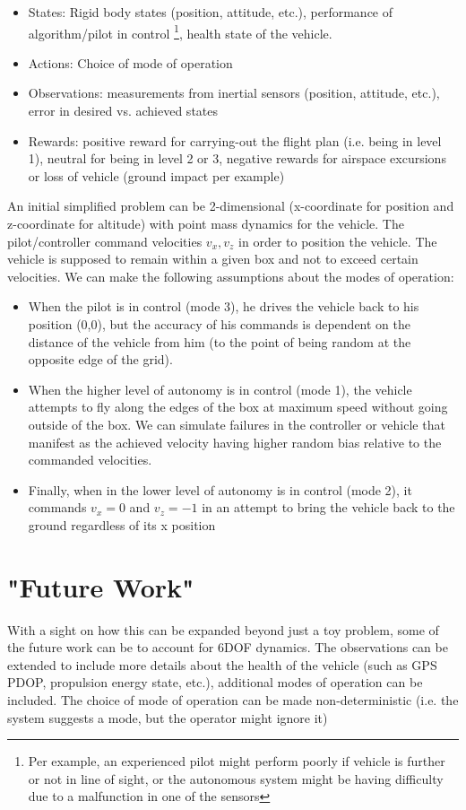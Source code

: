\documentclass[english]{article}
\begin{document}
\begin{itemize}
\item States: Rigid body states (position, attitude, etc.), performance of algorithm/pilot in control \footnote{Per example, an experienced pilot might perform poorly if vehicle is further or not in line of sight, or the autonomous system might be having difficulty due to a malfunction in one of the sensors}, health state of the vehicle.

\item Actions: Choice of mode of operation
\item Observations: measurements from inertial sensors (position, attitude, etc.), error in desired vs. achieved states
\item Rewards: positive reward for carrying-out the flight plan (i.e. being in level 1), neutral for being in level 2 or 3, negative rewards for airspace excursions or loss of vehicle (ground impact per example)
\end{itemize}

An initial simplified problem can be 2-dimensional (x-coordinate for position and z-coordinate for altitude) with point mass dynamics for the vehicle. The pilot/controller command velocities $v_x, v_z$ in order to position the vehicle. The vehicle is supposed to remain within a given box and not to exceed certain velocities. We can make the following assumptions about the modes of operation:
\begin{itemize}
\item When the pilot is in control (mode 3), he drives the vehicle back to his position (0,0), but the accuracy of his commands is dependent on the distance of the vehicle from him (to the point of being random at the opposite edge of the grid).
\item When the higher level of autonomy is in control (mode 1), the vehicle attempts to fly along the edges of the box at maximum speed without going outside of the box. We can simulate failures in the controller or vehicle that manifest as the achieved velocity having higher random bias relative to the commanded velocities.
\item Finally, when in the lower level of autonomy is in control (mode 2), it commands $v_x=0$  and $v_z=-1$ in an attempt to bring the vehicle back to the ground regardless of its x position
\end{itemize}


\section{"Future Work"}
With a sight on how this can be expanded beyond just a toy problem, some of the future work can be to account for 6DOF dynamics. The observations can be extended to include more details about the health of the vehicle (such as GPS PDOP, propulsion energy state, etc.), additional modes of operation can be included. The choice of mode of operation can be made non-deterministic (i.e. the system suggests a mode, but the operator might ignore it)
\end{document}
